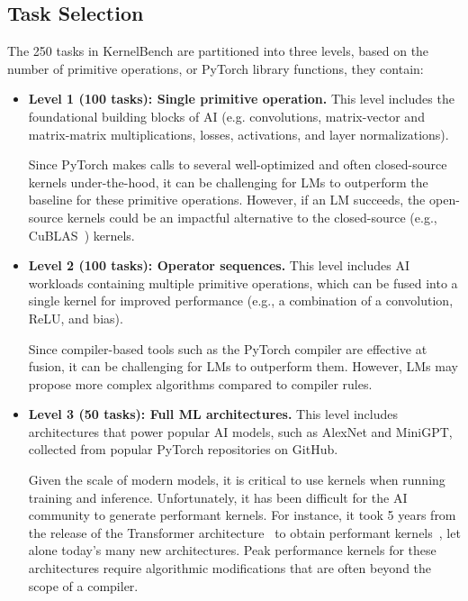 \subsection{Task Selection}
The 250 tasks in KernelBench are partitioned into three levels, based on the number of primitive operations, or PyTorch library functions, they contain:
\begin{itemize}[itemsep=0.1pt,topsep=0pt,leftmargin=*]
    \item \textbf{Level 1 (100 tasks): Single primitive operation.} This level includes the foundational building blocks of AI (e.g. convolutions, matrix-vector and matrix-matrix multiplications, losses, activations, and layer normalizations). 

    Since PyTorch makes calls to several well-optimized and often closed-source kernels under-the-hood, it can be challenging for LMs to outperform the baseline for these primitive operations. However, if an LM succeeds, the open-source kernels could be an impactful alternative to the closed-source (e.g., CuBLAS~\cite{nvidia2023cublas}) kernels.
    
    \item \textbf{Level 2 (100 tasks): Operator sequences.} This level includes AI workloads containing multiple primitive operations, which can be fused into a single kernel for  improved performance (e.g., a combination of a convolution, ReLU, and bias).

    Since compiler-based tools such as the PyTorch compiler are effective at fusion, it can be challenging for LMs to outperform them. However, LMs may propose more complex algorithms compared to compiler rules. 

    
    \item \textbf{Level 3 (50 tasks): Full ML architectures.} This level includes architectures that power popular AI models, such as AlexNet and MiniGPT, collected from  popular PyTorch repositories on GitHub.
    
    Given the scale of modern models, it is critical to use kernels when running training and inference. Unfortunately, it has been difficult for the AI community to generate performant kernels. For instance, it took 5 years from the release of the Transformer architecture~\cite{vaswani2018attention} to obtain performant kernels~\cite{dao2022flashattention}, let alone today's many new architectures. Peak performance kernels for these architectures require algorithmic modifications that are often beyond the scope of a compiler. 
    

\end{itemize}

